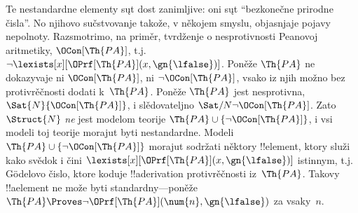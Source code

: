 \documentclass[../../../include/open-logic-section]{subfiles}
\begin{document}
Te nestandardne elementy sųt dost zanimljive: oni sųt ``bezkonečne
prirodne čisla''. No njihovo sučstvovanje takože, v někojem smyslu,
objasnjaje pojavy nepolnoty. Razsmotrimo, na priměr, tvrdženje o
nesprotivnosti Peanovoj aritmetiky, $\OCon[\Th{PA}]$, t.j. $\lnot
\lexists[x][\OPrf[\Th{PA}](x, \gn{\lfalse})]$. Poněže $\Th{PA}$ ne
dokazyvaje ni $\OCon[\Th{PA}]$, ni $\lnot \OCon[\Th{PA}]$, vsako iz
njih možno bez protivrěčnosti dodati k~$\Th{PA}$. Poněže $\Th{PA}$ jest
nesprotivna, $\Sat{N}{\OCon[\Th{PA}]}$, i slědovateljno
$\Sat/{N}{\lnot \OCon[\Th{PA}]}$. Zato $\Struct{N}$ \emph{ne} jest
modelom teorije $\Th{PA} \cup \{\lnot \OCon[\Th{PA}]\}$, i vsi modeli
toj teorije morajut byti nestandardne. Modeli $\Th{PA} \cup \{\lnot
\OCon[\Th{PA}]\}$ morajut sodržati něktory !!{element}, ktory služi
kako svědok i čini $\lexists[x][\OPrf[\Th{PA}](x, \gn{\lfalse})]$
istinnym, t.j. G\"odelovo čislo, ktore koduje !!a{derivation}
protivrěčnosti iz~$\Th{PA}$. Takovy !!a{element} ne može byti
standardny---poněže $\Th{PA} \Proves \lnot
\OPrf[\Th{PA}](\num{n}, \gn{\lfalse})$ za vsaky~$n$.
\end{document}

